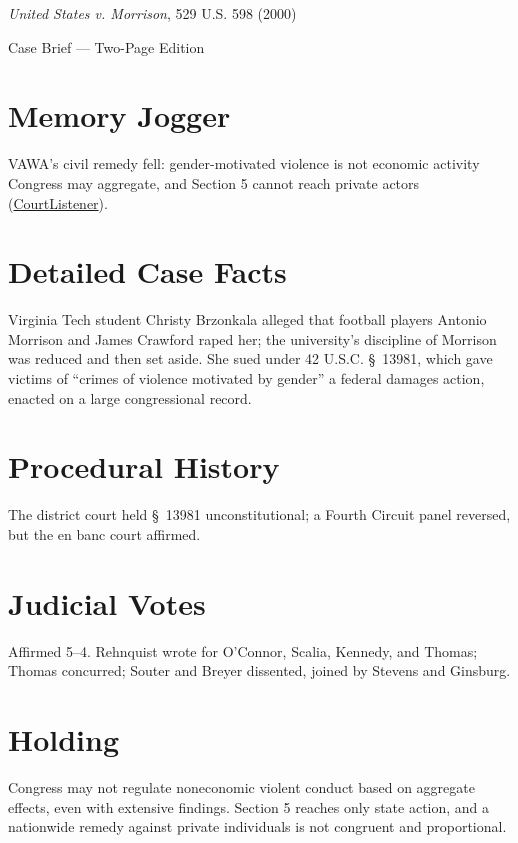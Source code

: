 \documentclass[12pt]{article}
\begin{document}
\begin{center}
{\LARGE \textit{United States v. Morrison}, 529 U.S. 598 (2000)\par}
\vspace{0.5em}
{\large Case Brief --- Two-Page Edition\par}
\end{center}

\section{Memory Jogger}
VAWA's civil remedy fell: gender-motivated violence is not economic activity Congress may aggregate, and Section 5 cannot reach private actors (\href{https://www.courtlistener.com/opinion/118363/united-states-v-morrison/}{CourtListener}).

\section{Detailed Case Facts}
Virginia Tech student Christy Brzonkala alleged that football players Antonio Morrison and James Crawford raped her; the university's discipline of Morrison was reduced and then set aside. She sued under 42 U.S.C. \S~13981, which gave victims of ``crimes of violence motivated by gender'' a federal damages action, enacted on a large congressional record.

\section{Procedural History}
The district court held \S~13981 unconstitutional; a Fourth Circuit panel reversed, but the en banc court affirmed.

\section{Judicial Votes}
Affirmed 5--4. Rehnquist wrote for O'Connor, Scalia, Kennedy, and Thomas; Thomas concurred; Souter and Breyer dissented, joined by Stevens and Ginsburg.

\section{Holding}
Congress may not regulate noneconomic violent conduct based on aggregate effects, even with extensive findings. Section 5 reaches only state action, and a nationwide remedy against private individuals is not congruent and proportional.
\end{document}

